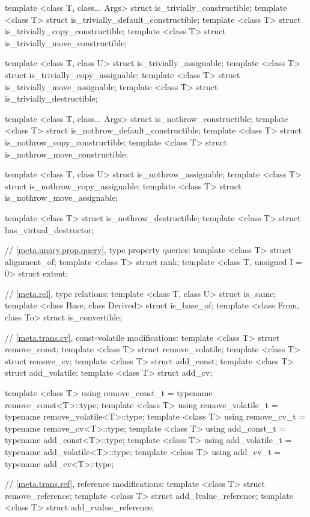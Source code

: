 \begin{codeblock}
{  template <class T, class... Args> struct is_trivially_constructible;
  template <class T> struct is_trivially_default_constructible;
  template <class T> struct is_trivially_copy_constructible;
  template <class T> struct is_trivially_move_constructible;

  template <class T, class U> struct is_trivially_assignable;
  template <class T> struct is_trivially_copy_assignable;
  template <class T> struct is_trivially_move_assignable;
  template <class T> struct is_trivially_destructible;

  template <class T, class... Args> struct is_nothrow_constructible;
  template <class T> struct is_nothrow_default_constructible;
  template <class T> struct is_nothrow_copy_constructible;
  template <class T> struct is_nothrow_move_constructible;

  template <class T, class U> struct is_nothrow_assignable;
  template <class T> struct  is_nothrow_copy_assignable;
  template <class T> struct is_nothrow_move_assignable;

  template <class T> struct is_nothrow_destructible;
  template <class T> struct has_virtual_destructor;

  // \ref{meta.unary.prop.query}, type property queries:
  template <class T> struct alignment_of;
  template <class T> struct rank;
  template <class T, unsigned I = 0> struct extent;

  // \ref{meta.rel}, type relations:
  template <class T, class U> struct is_same;
  template <class Base, class Derived> struct is_base_of;
  template <class From, class To> struct is_convertible;

  // \ref{meta.trans.cv}, const-volatile modifications:
  template <class T> struct remove_const;
  template <class T> struct remove_volatile;
  template <class T> struct remove_cv;
  template <class T> struct add_const;
  template <class T> struct add_volatile;
  template <class T> struct add_cv;

  template <class T>
    using remove_const_t    = typename remove_const<T>::type;
  template <class T>
    using remove_volatile_t = typename remove_volatile<T>::type;
  template <class T>
    using remove_cv_t       = typename remove_cv<T>::type;
  template <class T>
    using add_const_t       = typename add_const<T>::type;
  template <class T>
    using add_volatile_t    = typename add_volatile<T>::type;
  template <class T>
    using add_cv_t          = typename add_cv<T>::type;

  // \ref{meta.trans.ref}, reference modifications:
  template <class T> struct remove_reference;
  template <class T> struct add_lvalue_reference;
  template <class T> struct add_rvalue_reference;

}
\end{codeblock}
